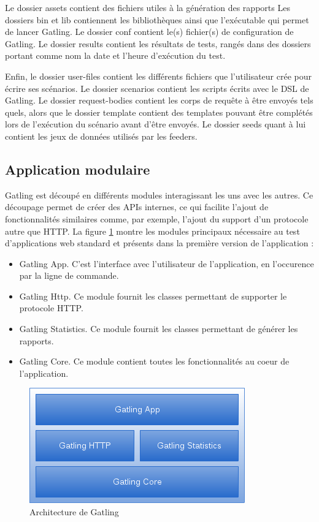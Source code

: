Le dossier assets contient des fichiers utiles à la génération des rapports Les dossiers bin et lib contiennent les bibliothèques ainsi que l'exécutable qui permet de lancer Gatling. Le dossier conf contient le(s) fichier(s) de configuration de Gatling. Le dossier results contient les résultats de tests, rangés dans des dossiers portant comme nom la date et l'heure d'exécution du test.

Enfin, le dossier user-files contient les différents fichiers que l'utilisateur crée pour écrire ses scénarios. Le dossier scenarios contient les scripts écrits avec le DSL de Gatling. Le dossier request-bodies contient les corps de requête à être envoyés tels quels, alors que le dossier template contient des templates pouvant être complétés lors de l'exécution du scénario avant d'être envoyés. Le dossier seeds quant à lui contient les jeux de données utilisés par les feeders.

\subsection{Application modulaire}
Gatling est découpé en différents modules interagissant les uns avec les autres. Ce découpage permet de créer des APIs internes, ce qui facilite l'ajout de fonctionnalités similaires comme, par exemple, l'ajout du support d'un protocole autre que HTTP. La figure \ref{arch} montre les modules principaux nécessaire au test d'applications web standard et présents dans la première version de l'application :
\begin{itemize}
  \item Gatling App. C'est l'interface avec l'utilisateur de l'application, en l'occurence par la ligne de commande.
  \item Gatling Http. Ce module fournit les classes permettant de supporter le protocole HTTP.
  \item Gatling Statistics. Ce module fournit les classes permettant de générer les rapports.
  \item Gatling Core. Ce module contient toutes les fonctionnalités au coeur de l'application.
\end{itemize}

\begin{figure}[h]
\begin{center}
\includegraphics{img/arch.png}
\end{center}
\caption{Architecture de Gatling}
\label{arch}
\end{figure}

